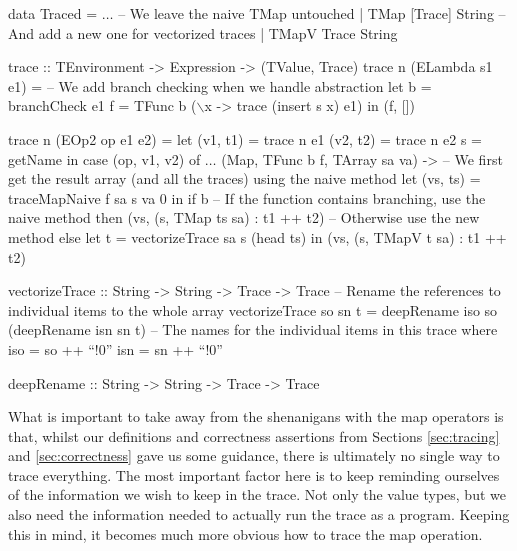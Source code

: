         \begin{haskell}[caption=Array mapping with trace vectorization, label=lst:vectorize, gobble=12]
            data Traced
                = $\ldots$
                -- We leave the naive TMap untouched
                | TMap  [Trace] String
                -- And add a new one for vectorized traces
                | TMapV Trace   String

            trace :: TEnvironment -> Expression -> (TValue, Trace)
            trace n (ELambda s1 e1) =
                -- We add branch checking when we handle abstraction
                let b = branchCheck e1
                    f = TFunc b ($\backslash$x -> trace (insert s x) e1)
                in  (f, [])

            trace n (EOp2 op e1 e2) =
                let (v1, t1) = trace n e1
                    (v2, t2) = trace n e2
                    s = getName
                in  case (op, v1, v2) of
                    $\ldots$
                    (Map, TFunc b f, TArray sa va) ->
                        -- We first get the result array (and all the traces) using the naive method
                        let (vs, ts) = traceMapNaive f sa s va 0
                        in  if   b
                            -- If the function contains branching, use the naive method
                            then (vs, (s, TMap ts sa) : t1 ++ t2)
                            -- Otherwise use the new method
                            else let t = vectorizeTrace sa s (head ts)
                                 in  (vs, (s, TMapV t sa) : t1 ++ t2)

            vectorizeTrace :: String -> String -> Trace -> Trace
            -- Rename the references to individual items to the whole array
            vectorizeTrace so sn t = deepRename iso so (deepRename isn sn t)
                -- The names for the individual items in this trace
                where iso = so ++ ``!0''
                      isn = sn ++ ``!0''

            deepRename :: String -> String -> Trace -> Trace
        \end{haskell}

        What is important to take away from the shenanigans with the map operators is that, whilst our definitions and correctness assertions from Sections \ref{sec:tracing} and \ref{sec:correctness} gave us some guidance, there is ultimately no single way to trace everything.
        The most important factor here is to keep reminding ourselves of the information we wish to keep in the trace.
        Not only the value types, but we also need the information needed to actually run the trace as a program.
        Keeping this in mind, it becomes much more obvious how to trace the map operation.
